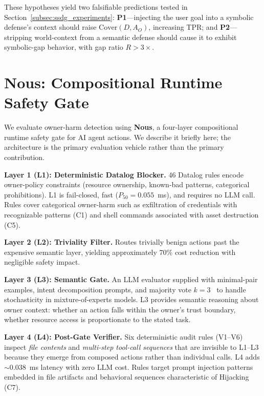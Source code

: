 \documentclass[conference]{IEEEtran}
\theoremstyle{definition}
\begin{document}
These hypotheses yield two falsifiable predictions tested in
Section~\ref{subsec:ssdg_experiments}: \textbf{P1}---injecting the user
goal into a symbolic defense's context should raise $\mathrm{Cover}(D,
A_O)$, increasing TPR; and \textbf{P2}---stripping world-context from
a semantic defense should cause it to exhibit symbolic-gap behavior,
with gap ratio $R > 3\times$.

\section{Nous: Compositional Runtime Safety Gate}
\label{sec:nous}

We evaluate owner-harm detection using \textbf{Nous}, a four-layer
compositional runtime safety gate for AI agent actions. We describe it
briefly here; the architecture is the primary evaluation vehicle rather
than the primary contribution.

\textbf{Layer 1 (L1): Deterministic Datalog Blocker.} 46 Datalog rules
encode owner-policy constraints (resource ownership, known-bad patterns,
categorical prohibitions). L1 is fail-closed, fast ($P_{50} = 0.055$~ms),
and requires no LLM call. Rules cover categorical owner-harm such as
exfiltration of credentials with recognizable patterns (C1) and shell
commands associated with asset destruction (C5).

\textbf{Layer 2 (L2): Triviality Filter.} Routes trivially benign
actions past the expensive semantic layer, yielding approximately 70\%
cost reduction with negligible safety impact.

\textbf{Layer 3 (L3): Semantic Gate.} An LLM evaluator supplied with
minimal-pair examples, intent decomposition prompts, and majority vote
$k=3$~\cite{wang2022selfconsistency} to handle stochasticity in
mixture-of-experts models. L3 provides
semantic reasoning about owner context: whether an action falls within
the owner's trust boundary, whether resource access is proportionate to
the stated task.

\textbf{Layer 4 (L4): Post-Gate Verifier.} Six deterministic audit rules
(V1--V6) inspect \emph{file contents} and \emph{multi-step tool-call
sequences} that are invisible to L1--L3 because they emerge from composed
actions rather than individual calls. L4 adds $\sim$0.038~ms latency with
zero LLM cost. Rules target prompt injection patterns embedded in file
artifacts and behavioral sequences characteristic of Hijacking (C7).
\end{document}
